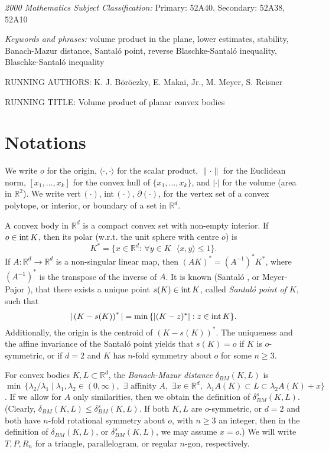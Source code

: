 \documentclass[12pt]{article}
\newcommand{\R}{\mathbb{R}}
\begin{document}
\emph{2000 Mathematics Subject Classification:} Primary: 52A40. 
Secondary: 52A38, %
52A10 %

\emph{Keywords and phrases:} volume product in the plane, lower estimates,
stability, Banach-Mazur distance, Santal\'o point, reverse Blaschke-Santal\'o
inequality, Blaschke-Santal\'o inequality

RUNNING AUTHORS: K. J. B\"or\"oczky, E. Makai, Jr., M. Meyer, S. Reisner

RUNNING TITLE: Volume product of planar convex bodies


\section{Notations}

We write
$o$ for the origin,
$\langle \cdot,\cdot \rangle$ for the scalar product,
$\|\cdot\|$ for the Euclidean norm, $[x_1,\ldots,x_k]$
for the convex hull of $ \{ x_1,\ldots,x_k \} $, and 
$| \cdot |$ for the volume (area in ${\mathbb R}^2$).
We write vert\,$( \cdot )$, int\,$( \cdot )$, $\partial ( \cdot )$, for the
vertex set of a convex polytope, or interior, or boundary of a set in
${\R}^d$. 

A convex body in $\R^d$ is a compact convex set with non-empty interior.
If $o\in {\rm int}\,K$, then
its polar (w.r.t. the unit sphere with centre $o$) is
$$
K^*=\{x\in\R^d:\, \forall y \in K\,\,\,\, \langle x,y\rangle\leq 1\}.
$$
If $A:\R^d\to\R^d$ is a non-singular linear map,
then $(AK)^*=(A^{-1})^*K^*$, where $(A^{-1})^*$ is the transpose
of the inverse of $A$.
It is known (Santal\'o \cite{San}, or Meyer-Pajor \cite{MP90}),
that there exists a unique point
$s(K) \in{\rm int}\,K$, called {\it{Santal\'o point of $K$}}, such that
$$
|\left( K-s(K) \right) ^*|=\min \, \{ |(K-z)^*| : z \in {\rm int}\,K \}.
$$
Additionally, the origin is the centroid of $\left( K-s(K) \right) ^*$.
The uniqueness and the affine invariance of the Santal\'o point yields that
$s(K)=o$ if $K$ is $o$-symmetric, or if $d=2$ and $K$
has $n$-fold symmetry about $o$ for some $n \geq 3$.

For convex bodies $K,L \subset {{\mathbb R}^d}$, 
the {\it{Banach-Mazur distance}}
$\delta _{BM}(K,L)$ is $\min \, \{ \lambda _2 / \lambda _1 \mid \lambda _1,
\lambda _2 \in (0, \infty ),\,\, \exists 
{\text{ affinity }} A, \,\, \exists x \in {{\mathbb R}^d}, \,\, \lambda _1 A(K)
\subset L \subset \lambda _2 A(K) +x \} $. If we allow for $A$ only
similarities, then we obtain the definition of $\delta _{BM}^s
(K,L)$. (Clearly, $\delta _{BM}(K,L) \le \delta _{BM}^s (K,L)$. If 
both $K,L$ are $o$-symmetric, or $d=2$ and both
have $n$-fold rotational symmetry about $o$,
with $n \ge 3$ an integer,
then in the definition of $\delta _{BM}(K,L)$, or $\delta _{BM}^s (K,L)$, we
may assume $x=o$.) We will write $T,P,R_n$ for a triangle, parallelogram, or
regular $n$-gon, respectively.
\end{document}
